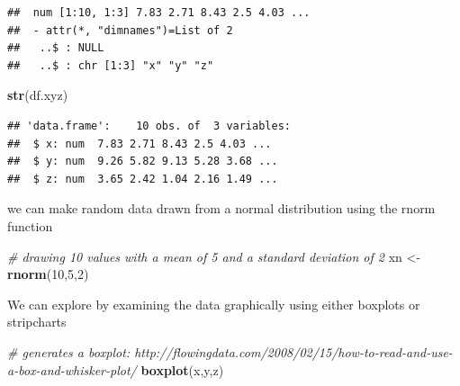 \documentclass[]{article}
\newenvironment{Shaded}{}{}
\newcommand{\KeywordTok}[1]{\textcolor[rgb]{0.00,0.44,0.13}{\textbf{{#1}}}}
\newcommand{\DecValTok}[1]{\textcolor[rgb]{0.25,0.63,0.44}{{#1}}}
\newcommand{\StringTok}[1]{\textcolor[rgb]{0.25,0.44,0.63}{{#1}}}
\newcommand{\CommentTok}[1]{\textcolor[rgb]{0.38,0.63,0.69}{\textit{{#1}}}}
\newcommand{\NormalTok}[1]{{#1}}
\begin{document}
\begin{verbatim}
##  num [1:10, 1:3] 7.83 2.71 8.43 2.5 4.03 ...
##  - attr(*, "dimnames")=List of 2
##   ..$ : NULL
##   ..$ : chr [1:3] "x" "y" "z"
\end{verbatim}

\begin{Shaded}
\begin{Highlighting}[]
\KeywordTok{str}\NormalTok{(df.xyz)}
\end{Highlighting}
\end{Shaded}

\begin{verbatim}
## 'data.frame':    10 obs. of  3 variables:
##  $ x: num  7.83 2.71 8.43 2.5 4.03 ...
##  $ y: num  9.26 5.82 9.13 5.28 3.68 ...
##  $ z: num  3.65 2.42 1.04 2.16 1.49 ...
\end{verbatim}

we can make random data drawn from a normal distribution using the rnorm
function

\begin{Shaded}
\begin{Highlighting}[]
\CommentTok{# drawing 10 values with a mean of 5 and a standard deviation of 2}
\NormalTok{xn <-}\StringTok{ }\KeywordTok{rnorm}\NormalTok{(}\DecValTok{10}\NormalTok{,}\DecValTok{5}\NormalTok{,}\DecValTok{2}\NormalTok{)}
\end{Highlighting}
\end{Shaded}

We can explore by examining the data graphically using either boxplots
or stripcharts

\begin{Shaded}
\begin{Highlighting}[]
\CommentTok{# generates a boxplot: http://flowingdata.com/2008/02/15/how-to-read-and-use-a-box-and-whisker-plot/}
\KeywordTok{boxplot}\NormalTok{(x,y,z)}
\end{Highlighting}
\end{Shaded}
\end{document}
